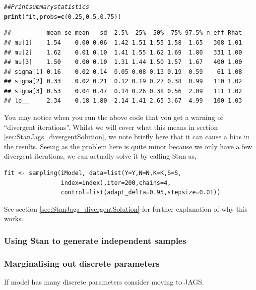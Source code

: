 \documentclass[11pt,fullpage]{book}
\makeatletter
\newenvironment{kframe}{%
	\def\at@end@of@kframe{}%
	\ifinner\ifhmode%
	\def\at@end@of@kframe{\end{minipage}}%
\begin{minipage}{\columnwidth}%
	\fi\fi%
	\def\FrameCommand##1{\hskip\@totalleftmargin \hskip-\fboxsep
		\colorbox{shadecolor}{##1}\hskip-\fboxsep
		\hskip-\linewidth \hskip-\@totalleftmargin \hskip\columnwidth}%
	\MakeFramed {\advance\hsize-\width
		\@totalleftmargin\z@ \linewidth\hsize
		\@setminipage}}%
{\par\unskip\endMakeFramed%
	\at@end@of@kframe}
\newcommand{\hlnum}[1]{\textcolor[rgb]{0.686,0.059,0.569}{#1}}%
\newcommand{\hlcom}[1]{\textcolor[rgb]{0.678,0.584,0.686}{\textit{#1}}}%
\newcommand{\hlstd}[1]{\textcolor[rgb]{0.345,0.345,0.345}{#1}}%
\newcommand{\hlkwc}[1]{\textcolor[rgb]{0.333,0.667,0.333}{#1}}%
\newcommand{\hlkwd}[1]{\textcolor[rgb]{0.737,0.353,0.396}{\textbf{#1}}}%
\newenvironment{knitrout}{}{} %
\makeatother
\begin{document}
\begin{knitrout}\small
		\color{fgcolor}\begin{kframe}
			\begin{alltt}
				\hlcom{## Print summary statistics}
				\hlkwd{print}\hlstd{(fit,}\hlkwc{probs} \hlstd{=} \hlkwd{c}\hlstd{(}\hlnum{0.25}\hlstd{,} \hlnum{0.5}\hlstd{,} \hlnum{0.75}\hlstd{))}
			\end{alltt}
			\begin{verbatim}
##          mean se_mean   sd  2.5%  25%  50%  75% 97.5% n_eff Rhat
## mu[1]    1.54    0.00 0.06  1.42 1.51 1.55 1.58  1.65   308 1.01
## mu[2]    1.62    0.01 0.10  1.41 1.55 1.62 1.69  1.80   331 1.00
## mu[3]    1.50    0.00 0.10  1.31 1.44 1.50 1.57  1.67   400 1.00
## sigma[1] 0.16    0.02 0.14  0.05 0.08 0.13 0.19  0.59    61 1.08
## sigma[2] 0.33    0.02 0.21  0.12 0.19 0.27 0.38  0.99   110 1.02
## sigma[3] 0.53    0.04 0.47  0.14 0.26 0.38 0.56  2.09   111 1.02
## lp__     2.34    0.18 1.80 -2.14 1.41 2.65 3.67  4.99   100 1.03
			\end{verbatim}
		\end{kframe}
	\end{knitrout}


You may notice when you run the above code that you get a warning of ``divergent iterations''. Whilst we will cover what this means in section \ref{sec:StanJags_divergentSolution}, we note briefly here that it can cause a bias in the results. Seeing as the problem here is quite minor because we only have a few divergent iterations, we can actually solve it by calling Stan as,

\begin{verbatim}
fit <- sampling(iModel, data=list(Y=Y,N=N,K=K,S=S,
                index=index),iter=200,chains=4,
                control=list(adapt_delta=0.95,stepsize=0.01))
\end{verbatim}

See section \ref{sec:StanJags_divergentSolution} for further explanation of why this works.

\subsubsection{Using Stan to generate independent samples}\label{sec:StanJags_independent}

\subsubsection{Marginalising out discrete parameters}\label{sec:StanJags_discrete}
If model has many discrete parameters consider moving to JAGS.
\end{document}
